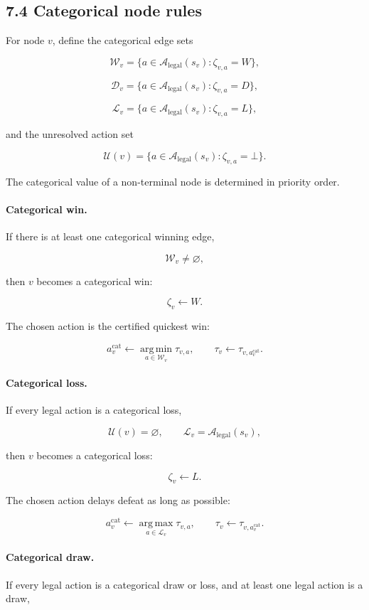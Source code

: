 \documentclass[11pt]{article}
\newcommand{\argmax}{\operatorname*{arg\,max}}
\newcommand{\argmin}{\operatorname*{arg\,min}}
\newcommand{\Legal}{\mathcal{A}_{\mathrm{legal}}}
\newcommand{\Unresolved}{\mathcal{U}}
\begin{document}
\subsection*{7.4 Categorical node rules}

For node \(v\), define the categorical edge sets

\[
\mathcal{W}_v=\{a\in\Legal(s_v):\zeta_{v,a}=W\},
\]

\[
\mathcal{D}_v=\{a\in\Legal(s_v):\zeta_{v,a}=D\},
\]

\[
\mathcal{L}_v=\{a\in\Legal(s_v):\zeta_{v,a}=L\},
\]

and the unresolved action set

\[
\Unresolved(v)=\{a\in\Legal(s_v):\zeta_{v,a}=\bot\}.
\]

The categorical value of a non-terminal node is determined in priority order.

\paragraph{Categorical win.}
If there is at least one categorical winning edge,

\[
\mathcal{W}_v\ne\varnothing,
\]

then \(v\) becomes a categorical win:

\[
\zeta_v\gets W.
\]

The chosen action is the certified quickest win:

\[
a_v^{\mathrm{cat}}
\gets
\argmin_{a\in\mathcal{W}_v}\tau_{v,a},
\qquad
\tau_v\gets\tau_{v,a_v^{\mathrm{cat}}}.
\]

\paragraph{Categorical loss.}
If every legal action is a categorical loss,

\[
\Unresolved(v)=\varnothing,
\qquad
\mathcal{L}_v=\Legal(s_v),
\]

then \(v\) becomes a categorical loss:

\[
\zeta_v\gets L.
\]

The chosen action delays defeat as long as possible:

\[
a_v^{\mathrm{cat}}
\gets
\argmax_{a\in\mathcal{L}_v}\tau_{v,a},
\qquad
\tau_v\gets\tau_{v,a_v^{\mathrm{cat}}}.
\]

\paragraph{Categorical draw.}
If every legal action is a categorical draw or loss, and at least one legal
action is a draw,
\end{document}
